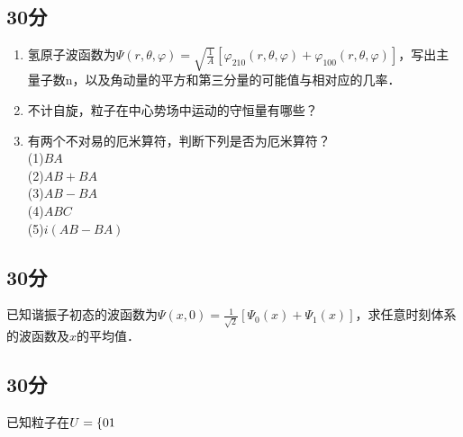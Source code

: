 
\subsection{30分}
\begin{enumerate}
\item 氢原子波函数为$\varPsi (r,\theta,\varphi)=\sqrt{\frac{1}{A}}[\varphi_{210}(r,\theta,\varphi)+\varphi_{100}(r,\theta,\varphi)]$，写出主量子数n，以及角动量的平方和第三分量的可能值与相对应的几率．
\item 不计自旋，粒子在中心势场中运动的守恒量有哪些？
\item 有两个不对易的厄米算符，判断下列是否为厄米算符？\\
(1)$BA$\\(2)$AB+BA$\\(3)$AB-BA$\\(4)$ABC$\\(5)$i(AB-BA)$
\end{enumerate}
\subsection{30分}
已知谐振子初态的波函数为$\varPsi(x,0)=\frac{1}{\sqrt{2}}[\varPsi_{0}(x)+\varPsi_{1}(x)]$，求任意时刻体系的波函数及$x$的平均值．
\subsection{30分}
已知粒子在$U=\lbrace{0\\1}$